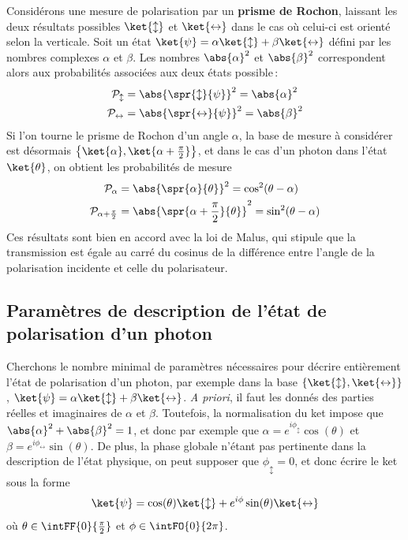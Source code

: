         Considérons une mesure de polarisation par un \textbf{prisme de Rochon}, laissant les deux résultats possibles $\ket{\updownarrow}$ et $\ket{\leftrightarrow}$ dans le cas où celui-ci est orienté selon la verticale. Soit un état $\ket{\psi} = \alpha \ket{\updownarrow} + \beta \ket{\leftrightarrow}$ défini par les nombres complexes $\alpha$ et $\beta$. Les nombres $\abs{\alpha}^2$ et $\abs{\beta}^2$ correspondent alors aux probabilités associées aux deux états possible :
        \begin{align*}
            \mathcal{P}_{\updownarrow} &= \abs{\spr{\updownarrow}{\psi}}^2 = \abs{\alpha}^2 \\
            \mathcal{P}_{\leftrightarrow} &= \abs{\spr{\leftrightarrow}{\psi}}^2 = \abs{\beta}^2 \\
        \end{align*}
        Si l’on tourne le prisme de Rochon d’un angle $\alpha$, la base de mesure à considérer est désormais $\left\{\ket{\alpha}, \ket{\alpha + \frac{\pi}{2}}\right\}$, et dans le cas d’un photon dans l’état $\ket{\theta}$, on obtient les probabilités de mesure 
        \begin{align*}
            \mathcal{P}_{\alpha} &= \abs{\spr{\alpha}{\theta}}^2  = \cos^2(\theta-\alpha) \\
            \mathcal{P}_{\alpha + \frac{\pi}{2}} &= \abs{\spr{\alpha + \frac{\pi}{2}}{\theta}}^2  = \sin^2(\theta-\alpha) \\
        \end{align*}
        Ces résultats sont bien en accord avec la loi de Malus, qui stipule que la transmission est égale au carré du cosinus de la différence entre l’angle de la polarisation incidente et celle du polarisateur.

        \subsection{Paramètres de description de l’état de polarisation d’un photon}

        Cherchons le nombre minimal de paramètres nécessaires pour décrire entièrement l’état de polarisation d’un photon, par exemple dans la base $\left\{\ket{\updownarrow}, \ket{\leftrightarrow}\right\}$, $\ket{\psi} = \alpha \ket{\updownarrow} + \beta \ket{\leftrightarrow}$. \textit{A priori}, il faut les donnés des parties réelles et imaginaires de $\alpha$ et $\beta$. Toutefois, la normalisation du ket impose que $\abs{\alpha}^2 + \abs{\beta}^2 = 1$, et donc par exemple que $\alpha = e^{i\phi_{\updownarrow}} \cos(\theta)$ et $\beta = e^{i \phi_{\leftrightarrow}} \sin(\theta)$. De plus, la phase globale n’étant pas pertinente dans la description de l’état physique, on peut supposer que $\phi_{\updownarrow} = 0$, et donc écrire le ket sous la forme 
        \[ \ket{\psi} = \cos(\theta)\ket{\updownarrow} + e^{i \phi} \sin(\theta)\ket{\leftrightarrow} \]   
        où $\theta \in \intFF{0}{\frac{\pi}{2}}$ et $\phi \in \intFO{0}{2\pi}$.

